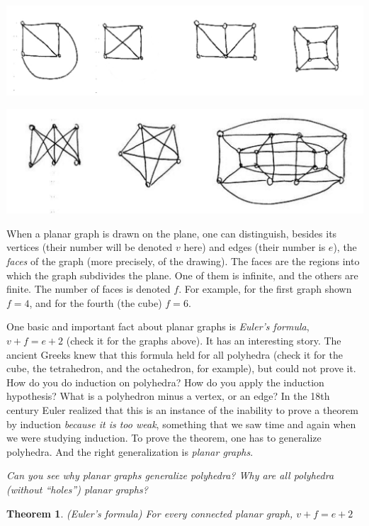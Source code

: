 \documentclass[11pt]{article}
\newcounter{thm}
\newtheorem{theorem}{Theorem}[thm]
\begin{document}
\includegraphics[scale=.7]{figures/graphs_5}

\includegraphics[scale=.6]{figures/graphs_1}
 
When a planar graph is drawn on the plane, one can distinguish,
besides its vertices (their number will be denoted $v$ here) and
edges (their number is $e$), the {\em faces} of the graph (more
precisely, of the drawing). The faces are the regions into which the
graph subdivides the plane.  One of them is infinite, and the others
are finite.  The number of faces is denoted $f$.  For example, for
the first graph shown $f=4$, and for the fourth (the cube) $f=6$.


 

One basic and important fact about planar graphs is {\em Euler's
formula}, $v+f=e+2$ (check it for the graphs above).  It has an
interesting story.  The ancient Greeks knew that this formula held
for all polyhedra (check it for the cube, the tetrahedron, and the
octahedron, for example), but could not prove it.  How do you do
induction on polyhedra?  How do you apply the induction hypothesis?
What is a polyhedron minus a vertex, or an edge?  In the 18th
century Euler realized that this is an instance of the inability to
prove a theorem by induction {\em because it is too weak}, something
that we saw time and again when we were studying induction.  To
prove the theorem, one has to generalize polyhedra.  And the right
generalization is {\em planar graphs}.

{\em Can you see why planar graphs generalize polyhedra?  Why are
all polyhedra (without ``holes'') planar graphs?}

\begin{theorem}  (Euler's formula)
For every connected planar graph, $v+f=e+2$
\end{theorem}
\end{document}
